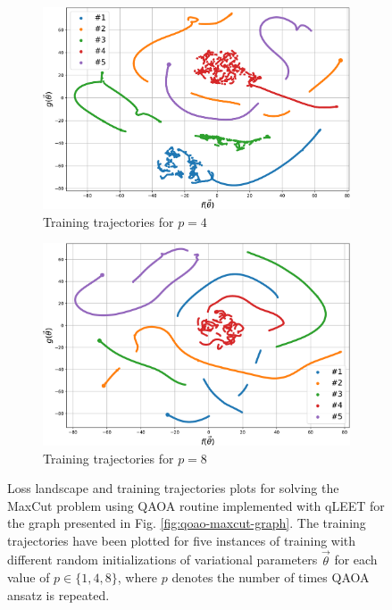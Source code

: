 \documentclass[%
 reprint,
 amsmath,
 amssymb,
 showkeys,
 pra,
 floatfix,
]{revtex4-2}
\begin{document}
\begin{figure}[htp]
\begin{subfigure}[b]{0.32\linewidth}
        \includegraphics[width=\textwidth]{images/training_trajectory_p2.pdf}
        \caption{Training trajectories for $p=4$\label{fig:train-p4}}
    \end{subfigure}
    \begin{subfigure}[b]{0.32\linewidth}
        \includegraphics[width=\textwidth]{images/training_trajectory_p3.pdf}
        \caption{Training trajectories for $p=8$\label{fig:train-p8}}
    \end{subfigure}%
    \caption{Loss landscape and training trajectories plots for solving the MaxCut problem using QAOA routine implemented with qLEET for the graph presented in Fig. \ref{fig:qoao-maxcut-graph}. The training trajectories have been plotted for five instances of training with different random initializations of variational parameters $\vec{\theta}$ for each value of $p\in\{1, 4, 8\}$, where $p$ denotes the number of times QAOA ansatz is repeated.}
    \label{fig:loss-land-train-traj}
\end{figure}
\end{document}
